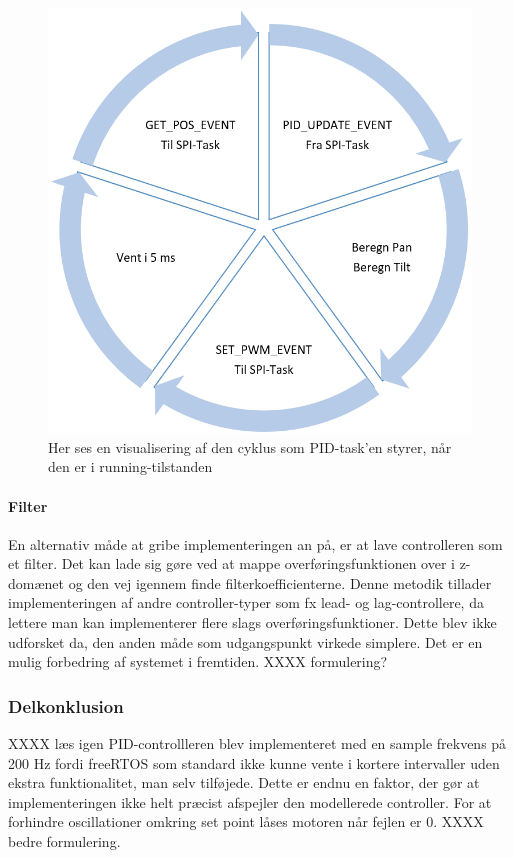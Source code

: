 \begin{figure}[ht]
	\begin{center}
	\includegraphics[scale=0.5]{Billeder/PID_update.png}
	\end{center}		
	\caption{Her ses en visualisering af den cyklus som PID-task'en styrer, når den er i running-tilstanden}
	\label{fig:PID_update}
\end{figure}

\paragraph{Filter}
En alternativ måde at gribe implementeringen an på, er at lave controlleren som et filter. Det kan lade sig gøre ved at mappe overføringsfunktionen over i z-domænet og den vej igennem finde filterkoefficienterne. Denne metodik tillader implementeringen af andre controller-typer som fx lead- og lag-controllere, da lettere man kan implementerer flere slags overføringsfunktioner. Dette blev ikke udforsket da, den anden måde som udgangspunkt virkede simplere. Det er en mulig forbedring af systemet i fremtiden. XXXX formulering?

\subsubsection{Delkonklusion}
XXXX læs igen
PID-controllleren blev implementeret med en sample frekvens på 200 Hz fordi freeRTOS som standard ikke kunne vente i kortere intervaller uden ekstra funktionalitet, man selv tilføjede. Dette er endnu en faktor, der gør at implementeringen ikke helt præcist  afspejler den modellerede controller. For at forhindre oscillationer omkring set point låses motoren når fejlen er 0. XXXX bedre formulering.

